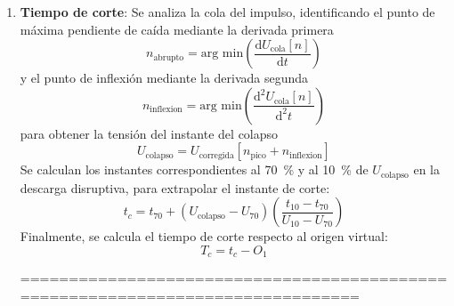 \begin{enumerate}
\begin{equation}
        \label{eq:curva_base_lic}
        U_\text{b, i}[n] = E \cdot U_\text{b, ref}[n]
    \end{equation}
    \item \textbf{Tiempo de corte}: Se analiza la cola del impulso, identificando el punto de máxima pendiente de caída mediante la derivada primera
    \begin{equation}
        \label{eq:gradiente_colapso}
        n_\text{abrupto} = \text{arg min}\left(\frac{\text{d} U_{\text{cola}}[n]}{\text{d} t}\right)
    \end{equation}
    y el punto de inflexión mediante la derivada segunda
    \begin{equation}
        \label{eq:derivada2_colapso}
        n_\text{inflexion} = \text{arg min}\left(\frac{\text{d}^2 U_\text{cola}[n]}{\text{d}^2 t}\right)
    \end{equation}
    para obtener la tensión del instante del colapso
    \begin{equation}
        U_\text{colapso} = U_\text{corregida}[n_\text{pico} + n_\text{inflexion}]
    \end{equation}
    Se calculan los instantes correspondientes al \qty{70}{\percent} y al \qty{10}{\percent} de $U_\text{colapso}$ en la descarga disruptiva, para extrapolar el instante de corte:
    \begin{equation}
        t_c = t_{70} + (U_{\text{colapso}} - U_{70}) \left(\frac{t_{10} - t_{70}}{U_{10} - U_{70}}\right)
    \end{equation}
    Finalmente, se calcula el tiempo de corte respecto al origen virtual:
    \begin{equation}
        T_c = t_c - O_1
    \end{equation}

===============================================================================


\end{enumerate}
